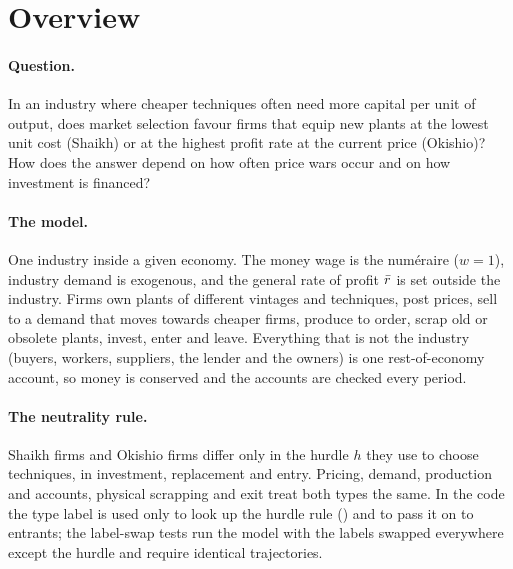 \section{Overview}

\paragraph{Question.} In an industry where cheaper techniques often need more capital per
unit of output, does market selection favour firms that equip new plants at the lowest unit
cost (Shaikh) or at the highest profit rate at the current price (Okishio)? How does the
answer depend on how often price wars occur and on how investment is financed?

\paragraph{The model.} One industry inside a given economy. The money wage is the
numéraire ($w = 1$), industry demand is exogenous, and the general rate of profit $\bar r$
is set outside the industry. Firms own plants of different vintages and techniques, post
prices, sell to a demand that moves towards cheaper firms, produce to order, scrap old or
obsolete plants, invest, enter and leave. Everything that is not the industry (buyers,
workers, suppliers, the lender and the owners) is one rest-of-economy account, so money is
conserved and the accounts are checked every period.

\paragraph{The neutrality rule.} Shaikh firms and Okishio firms differ only in the hurdle
$h$ they use to choose techniques, in investment, replacement and entry. Pricing, demand,
production and accounts, physical scrapping and exit treat both types the same. In the code
the type label is used only to look up the hurdle rule () and to
pass it on to entrants; the label-swap tests
run the model with the labels swapped everywhere except the hurdle and require identical
trajectories.

